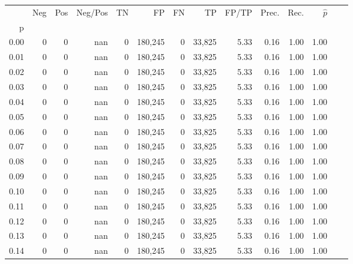 \begin{tabular}{rrrrrrrrrrrrrr}
\toprule
{} &    Neg &    Pos & Neg/Pos &       TN &       FP &      FN &      TP & FP/TP & Prec. &  Rec. & $\hat{p}$ \\
p    &        &        &         &          &          &         &         &       &       &       &           \\
\midrule
0.00 &      0 &      0 &     nan &        0 &  180,245 &       0 &  33,825 &  5.33 &  0.16 &  1.00 &      1.00 \\
0.01 &      0 &      0 &     nan &        0 &  180,245 &       0 &  33,825 &  5.33 &  0.16 &  1.00 &      1.00 \\
0.02 &      0 &      0 &     nan &        0 &  180,245 &       0 &  33,825 &  5.33 &  0.16 &  1.00 &      1.00 \\
0.03 &      0 &      0 &     nan &        0 &  180,245 &       0 &  33,825 &  5.33 &  0.16 &  1.00 &      1.00 \\
0.04 &      0 &      0 &     nan &        0 &  180,245 &       0 &  33,825 &  5.33 &  0.16 &  1.00 &      1.00 \\
0.05 &      0 &      0 &     nan &        0 &  180,245 &       0 &  33,825 &  5.33 &  0.16 &  1.00 &      1.00 \\
0.06 &      0 &      0 &     nan &        0 &  180,245 &       0 &  33,825 &  5.33 &  0.16 &  1.00 &      1.00 \\
0.07 &      0 &      0 &     nan &        0 &  180,245 &       0 &  33,825 &  5.33 &  0.16 &  1.00 &      1.00 \\
0.08 &      0 &      0 &     nan &        0 &  180,245 &       0 &  33,825 &  5.33 &  0.16 &  1.00 &      1.00 \\
0.09 &      0 &      0 &     nan &        0 &  180,245 &       0 &  33,825 &  5.33 &  0.16 &  1.00 &      1.00 \\
0.10 &      0 &      0 &     nan &        0 &  180,245 &       0 &  33,825 &  5.33 &  0.16 &  1.00 &      1.00 \\
0.11 &      0 &      0 &     nan &        0 &  180,245 &       0 &  33,825 &  5.33 &  0.16 &  1.00 &      1.00 \\
0.12 &      0 &      0 &     nan &        0 &  180,245 &       0 &  33,825 &  5.33 &  0.16 &  1.00 &      1.00 \\
0.13 &      0 &      0 &     nan &        0 &  180,245 &       0 &  33,825 &  5.33 &  0.16 &  1.00 &      1.00 \\
0.14 &      0 &      0 &     nan &        0 &  180,245 &       0 &  33,825 &  5.33 &  0.16 &  1.00 &      1.00 \\

\end{tabular}
